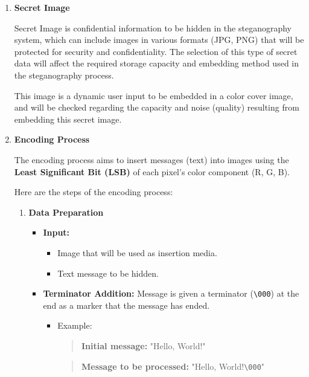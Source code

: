 \documentclass{ittelkom}
\begin{document}
\begin{enumerate}
    \item \textbf{Secret Image}

          Secret Image is confidential information to be hidden in the steganography
          system, which can include images in various formats (JPG, PNG) that will be
          protected for security and confidentiality. The selection of this type of
          secret data will affect the required storage capacity and embedding method used
          in the steganography process.

          This image is a dynamic user input to be embedded in a color cover image, and
          will be checked regarding the capacity and noise (quality) resulting from
          embedding this secret image.

    \item \textbf{Encoding Process}

          The encoding process aims to insert messages (text) into images using the
          \textbf{Least Significant Bit (LSB)} of each pixel's color component (R, G, B).

          Here are the steps of the encoding process:

          \begin{enumerate}
              \item \textbf{Data Preparation}

                    \begin{itemize}
                        \item \textbf{Input:}
                              \begin{itemize}
                                  \item Image that will be used as insertion media.
                                  \item Text message to be hidden.
                              \end{itemize}

                        \item \textbf{Terminator Addition:}
                              Message is given a terminator (\texttt{\textbackslash 000}) at the end as a marker that the message has ended.
                              \begin{itemize}
                                  \item Example:
                                        \begin{quote}
                                            \textbf{Initial message:} "Hello, World!"
                                        \end{quote}
                                        \begin{quote}
                                            \textbf{Message to be processed:} "Hello, World!\texttt{\textbackslash 000}"
                                        \end{quote}
                              \end{itemize}


\end{itemize}
\end{enumerate}
\end{enumerate}
\end{document}
